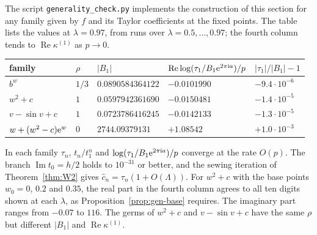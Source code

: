 \begin{remark}\label{rem:gen-numerics}
The script \texttt{generality\_check.py} implements the construction of this
section for any family given by $f$ and its Taylor coefficients at the fixed
points.  The table lists the values at $\lambda=0.97$, from runs over $\lambda=0.5,\dots,0.97$; the fourth column tends to $\operatorname{Re}\kappa^{(1)}$ as $p\to0$.
\begin{center}\small
\begin{tabular}{lllll}
\toprule
family & $\rho$ & $|B_1|$ & $\operatorname{Re}\log(\tau_1/B_1\mathrm{e}^{2\pi\mathrm{i} a})/p$ & $|\tau_1|/|B_1|-1$\\
\midrule
$b^w$ & $1/3$ & $0.0890584364122$ & $-0.0101990$ & $-9.4\cdot10^{-6}$\\
$w^2+c$ & $1$ & $0.0597942361690$ & $-0.0150481$ & $-1.4\cdot10^{-5}$\\
$v-\sin v+c$ & $1$ & $0.0723786416245$ & $-0.0142133$ & $-1.3\cdot10^{-5}$\\
$w+(w^2-c)\mathrm{e}^w$ & $0$ & $2744.09379131$ & $+1.08542$ & $+1.0\cdot10^{-3}$\\
\bottomrule
\end{tabular}
\end{center}
In each family $\tau_n$, $t_n/t_1^n$ and $\log(\tau_1/B_1\mathrm{e}^{2\pi\mathrm{i} a})/p$ converge at
the rate $O(p)$.  The branch $\operatorname{Im}t_0=h/2$ holds to $10^{-31}$ or
better, and the sewing iteration of Theorem~\ref{thm:W2} gives
$\hat c_n=\tau_n(1+O(\Lambda))$.  For $w^2+c$ with the base points $w_0=0$, $0.2$ and
$0.35$, the real part in the fourth column agrees to all ten digits shown at each $\lambda$, as
Proposition~\ref{prop:gen-base} requires.  The imaginary part ranges from
$-0.07$ to $116$.  The germs of $w^2+c$ and $v-\sin v+c$ have the same
$\rho$ but different $|B_1|$ and $\operatorname{Re}\kappa^{(1)}$.
\end{remark}

